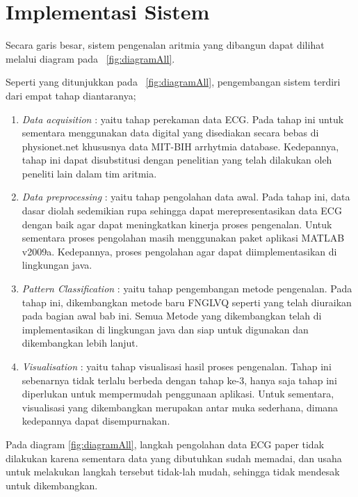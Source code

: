\section{Implementasi Sistem}
Secara garis besar, sistem pengenalan aritmia yang dibangun dapat dilihat
melalui diagram pada \pic~\ref{fig:diagramAll}. 


Seperti yang ditunjukkan pada \pic~\ref{fig:diagramAll}, pengembangan sistem
terdiri dari empat tahap diantaranya;
\begin{enumerate}
  \item \emph{Data acquisition} : yaitu tahap perekaman data ECG. Pada tahap
  ini untuk sementara menggunakan data digital yang disediakan secara bebas di
  physionet.net khususnya data MIT-BIH arrhytmia database. Kedepannya, tahap ini dapat
  disubstitusi dengan penelitian yang telah dilakukan oleh peneliti lain dalam tim aritmia.
  \item \emph{Data preprocessing} : yaitu tahap pengolahan data awal. Pada tahap
  ini, data dasar diolah sedemikian rupa sehingga dapat merepresentasikan data
  ECG dengan baik agar dapat meningkatkan kinerja proses pengenalan. Untuk
  sementara proses pengolahan masih menggunakan paket aplikasi MATLAB v2009a.
  Kedepannya, proses pengolahan agar dapat diimplementasikan di lingkungan java.
  \item \emph{Pattern Classification} : yaitu tahap pengembangan metode
  pengenalan. Pada tahap ini, dikembangkan metode baru FNGLVQ seperti yang
  telah diuraikan pada bagian awal bab ini. Semua Metode yang dikembangkan telah
  di implementasikan di lingkungan java dan siap untuk digunakan dan
  dikembangkan lebih lanjut.
  \item \emph{Visualisation} : yaitu tahap visualisasi hasil proses pengenalan.
  Tahap ini sebenarnya tidak terlalu berbeda dengan tahap ke-3, hanya saja tahap
  ini diperlukan untuk mempermudah penggunaan aplikasi. Untuk sementara,
  visualisasi yang dikembangkan merupakan antar muka sederhana, dimana
  kedepannya dapat disempurnakan.
\end{enumerate}

Pada diagram \ref{fig:diagramAll}, langkah pengolahan data ECG paper tidak
dilakukan karena sementara data yang dibutuhkan sudah memadai, dan usaha untuk
melakukan langkah tersebut tidak-lah mudah, sehingga tidak  mendesak untuk
dikembangkan.

